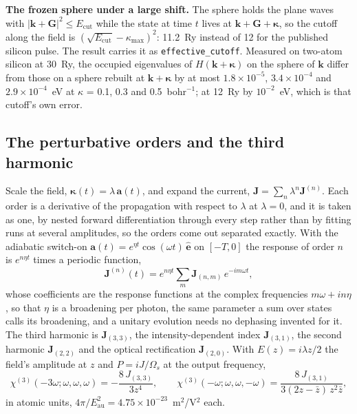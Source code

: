 \documentclass[11pt,a4paper]{article}
\newcommand{\code}[1]{\texttt{\small #1}}
\begin{document}
\textbf{The frozen sphere under a large shift.} The sphere holds the plane waves
with $|\mathbf k+\mathbf G|^2\le E_{\mathrm{cut}}$ while the state at time $t$
lives at $\mathbf k+\mathbf G+\boldsymbol\kappa$, so the cutoff along the field is
$(\sqrt{E_{\mathrm{cut}}}-\kappa_{\max})^2$: 11.2~Ry instead of 12 for the
published silicon pulse. The result carries it as \code{effective\_cutoff}.
Measured on two-atom silicon at 30~Ry, the occupied eigenvalues of
$H(\mathbf k+\boldsymbol\kappa)$ on the sphere of $\mathbf k$ differ from those on
a sphere rebuilt at $\mathbf k+\boldsymbol\kappa$ by at most $1.8\times10^{-5}$,
$3.4\times10^{-4}$ and $2.9\times10^{-4}$~eV at $\kappa$ = 0.1, 0.3 and
0.5~bohr$^{-1}$; at 12~Ry by $10^{-2}$~eV, which is that cutoff's own error.

\subsection{The perturbative orders and the third harmonic}

Scale the field, $\boldsymbol\kappa(t) = \lambda\,\mathbf a(t)$, and expand the
current, $\mathbf J = \sum_n\lambda^n\mathbf J^{(n)}$. Each order is a
derivative of the propagation with respect to $\lambda$ at $\lambda=0$, and it
is taken as one, by nested forward differentiation through every step rather
than by fitting runs at several amplitudes, so the orders come out separated
exactly. With the adiabatic switch-on $\mathbf a(t) = e^{\eta t}\cos(\omega t)\,
\hat{\mathbf e}$ on $[-T,0]$ the response of order $n$ is $e^{n\eta t}$ times a
periodic function,
\begin{equation*}
\mathbf J^{(n)}(t) = e^{n\eta t}\sum_m \mathbf J_{(n,m)}\,e^{-im\omega t},
\end{equation*}
whose coefficients are the response functions at the complex frequencies
$m\omega+in\eta$, so that $\eta$ is a broadening per photon, the same parameter a
sum over states calls its broadening, and a unitary evolution needs no
dephasing invented for it. The third harmonic is $\mathbf J_{(3,3)}$, the
intensity-dependent index $\mathbf J_{(3,1)}$, the second harmonic
$\mathbf J_{(2,2)}$ and the optical rectification $\mathbf J_{(2,0)}$. With
$E(z) = i\lambda z/2$ the field's amplitude at $z$ and $P = iJ/\Omega_s$ at the
output frequency,
\begin{equation*}
\chi^{(3)}(-3\omega;\omega,\omega,\omega) = -\frac{8\,J_{(3,3)}}{3z^4},\qquad
\chi^{(3)}(-\omega;\omega,\omega,-\omega) = \frac{8\,J_{(3,1)}}{3(2z-\bar z)\,z^2\bar z},
\end{equation*}
in atomic units, $4\pi/E_{\mathrm{au}}^2 = 4.75\times10^{-23}$~m$^2$/V$^2$ each.
\end{document}

